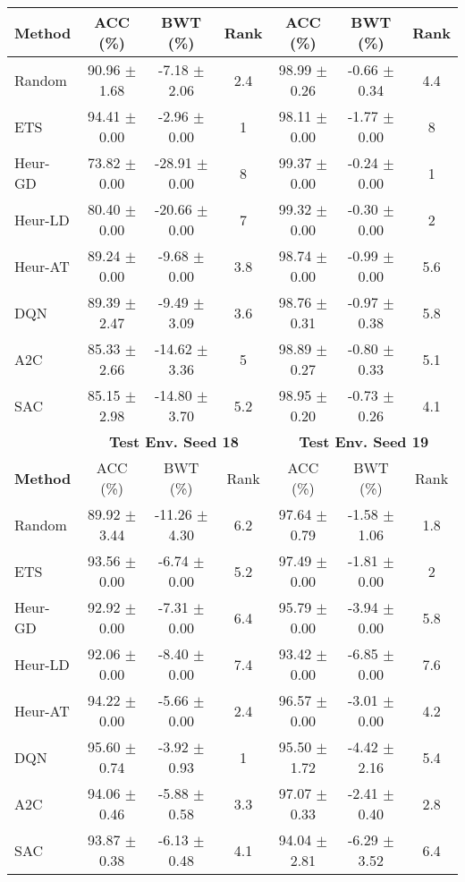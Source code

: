\begin{tabular}{lcccccc}
	\cmidrule(lr){2-4} \cmidrule(lr){5-7}
	\textbf{Method} & ACC (\%)          & BWT (\%)          & Rank   & ACC (\%)          & BWT (\%)          & Rank   \\
	\midrule 
	Random          & 90.96 $\pm$ 1.68    & -7.18 $\pm$ 2.06    & 2.4    & 98.99 $\pm$ 0.26    & -0.66 $\pm$ 0.34    & 4.4    \\
	ETS             & 94.41 $\pm$ 0.00    & -2.96 $\pm$ 0.00    & 1      & 98.11 $\pm$ 0.00    & -1.77 $\pm$ 0.00    & 8      \\
	Heur-GD         & 73.82 $\pm$ 0.00    & -28.91 $\pm$ 0.00   & 8      & 99.37 $\pm$ 0.00    & -0.24 $\pm$ 0.00    & 1      \\
	Heur-LD         & 80.40 $\pm$ 0.00    & -20.66 $\pm$ 0.00   & 7      & 99.32 $\pm$ 0.00    & -0.30 $\pm$ 0.00    & 2      \\
	Heur-AT         & 89.24 $\pm$ 0.00    & -9.68 $\pm$ 0.00    & 3.8    & 98.74 $\pm$ 0.00    & -0.99 $\pm$ 0.00    & 5.6    \\
	DQN             & 89.39 $\pm$ 2.47    & -9.49 $\pm$ 3.09    & 3.6    & 98.76 $\pm$ 0.31    & -0.97 $\pm$ 0.38    & 5.8    \\
	A2C             & 85.33 $\pm$ 2.66    & -14.62 $\pm$ 3.36   & 5      & 98.89 $\pm$ 0.27    & -0.80 $\pm$ 0.33    & 5.1    \\
	SAC             & 85.15 $\pm$ 2.98    & -14.80 $\pm$ 3.70   & 5.2    & 98.95 $\pm$ 0.20    & -0.73 $\pm$ 0.26    & 4.1    \\
	\midrule 
	& \multicolumn{3}{c}{\textbf{Test Env. Seed 18}} & \multicolumn{3}{c}{\textbf{Test Env. Seed 19}} \\
	\cmidrule(lr){2-4} \cmidrule(lr){5-7}
	\textbf{Method} & ACC (\%)          & BWT (\%)          & Rank   & ACC (\%)          & BWT (\%)          & Rank   \\
	\midrule 
	Random          & 89.92 $\pm$ 3.44    & -11.26 $\pm$ 4.30   & 6.2    & 97.64 $\pm$ 0.79    & -1.58 $\pm$ 1.06    & 1.8    \\
	ETS             & 93.56 $\pm$ 0.00    & -6.74 $\pm$ 0.00    & 5.2    & 97.49 $\pm$ 0.00    & -1.81 $\pm$ 0.00    & 2      \\
	Heur-GD         & 92.92 $\pm$ 0.00    & -7.31 $\pm$ 0.00    & 6.4    & 95.79 $\pm$ 0.00    & -3.94 $\pm$ 0.00    & 5.8    \\
	Heur-LD         & 92.06 $\pm$ 0.00    & -8.40 $\pm$ 0.00    & 7.4    & 93.42 $\pm$ 0.00    & -6.85 $\pm$ 0.00    & 7.6    \\
	Heur-AT         & 94.22 $\pm$ 0.00    & -5.66 $\pm$ 0.00    & 2.4    & 96.57 $\pm$ 0.00    & -3.01 $\pm$ 0.00    & 4.2    \\
	DQN             & 95.60 $\pm$ 0.74    & -3.92 $\pm$ 0.93    & 1      & 95.50 $\pm$ 1.72    & -4.42 $\pm$ 2.16    & 5.4    \\
	A2C             & 94.06 $\pm$ 0.46    & -5.88 $\pm$ 0.58    & 3.3    & 97.07 $\pm$ 0.33    & -2.41 $\pm$ 0.40    & 2.8    \\
	SAC             & 93.87 $\pm$ 0.38    & -6.13 $\pm$ 0.48    & 4.1    & 94.04 $\pm$ 2.81    & -6.29 $\pm$ 3.52    & 6.4   \\
	\bottomrule 
\end{tabular}